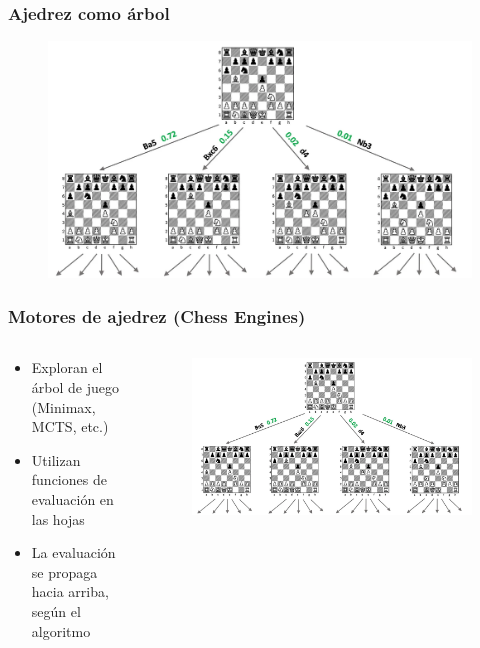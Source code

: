 \begin{frame}
\frametitle{Ajedrez como árbol}
\begin{figure}
    \centering
    \includegraphics[width=1.0\linewidth]{../assets/slides/chess_tree.png}
\end{figure}
\end{frame}

\begin{frame}
\frametitle{Motores de ajedrez (Chess Engines)}
\begin{columns}
    \begin{column}{0.5\textwidth}
        \begin{itemize}
            \item<1-> Exploran el árbol de juego (Minimax, MCTS, etc.)
            \item<2-> Utilizan funciones de evaluación en las hojas
            \item<3-> La evaluación se propaga hacia arriba, según el algoritmo
        \end{itemize}
    \end{column}
    \begin{column}{0.6\textwidth}
        \begin{figure}
            \centering
            \includegraphics[width=0.9\linewidth]{../assets/slides/chess_tree.png}
        \end{figure}
    \end{column}
\end{columns}
\end{frame}

